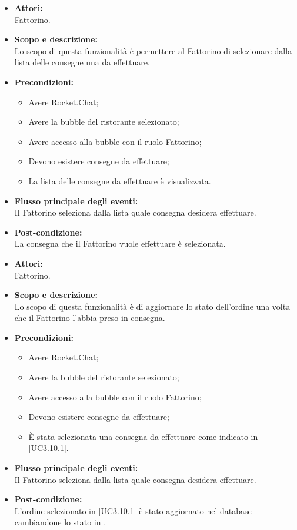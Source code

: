 \begin{itemize}
	\item \textbf{Attori:}
	\\Fattorino.
	\item \textbf{Scopo e descrizione:} 
	\\Lo scopo di questa funzionalità è permettere al Fattorino di selezionare dalla lista delle consegne una da effettuare.
	\item \textbf{Precondizioni:}
	\begin{itemize}
		\item Avere Rocket.Chat;
		\item Avere la bubble del ristorante selezionato;
		\item Avere accesso alla bubble con il ruolo Fattorino;
		\item Devono esistere consegne da effettuare;
		\item La lista delle consegne da effettuare è visualizzata.
	\end{itemize}
	\item \textbf{Flusso principale degli eventi:}
	\\Il Fattorino seleziona dalla lista quale consegna desidera effettuare.
	\item \textbf{Post-condizione:}
	\\La consegna che il Fattorino vuole effettuare è selezionata.
\end{itemize}


\begin{itemize}
	\item \textbf{Attori:}
	\\Fattorino.
	\item \textbf{Scopo e descrizione:} 
	\\Lo scopo di questa funzionalità è di aggiornare lo stato dell'ordine una volta che il Fattorino l'abbia preso in consegna.
	\item \textbf{Precondizioni:}
	\begin{itemize}
		\item Avere Rocket.Chat;
		\item Avere la bubble del ristorante selezionato;
		\item Avere accesso alla bubble con il ruolo Fattorino;
		\item Devono esistere consegne da effettuare;
		\item È stata selezionata una consegna da effettuare come indicato in \ref{UC3.10.1}.
	\end{itemize}
	\item \textbf{Flusso principale degli eventi:}
	\\Il Fattorino seleziona dalla lista quale consegna desidera effettuare.
	\item \textbf{Post-condizione:}
	\\L'ordine selezionato in \ref{UC3.10.1} è stato aggiornato nel database cambiandone lo stato in .
\end{itemize}

